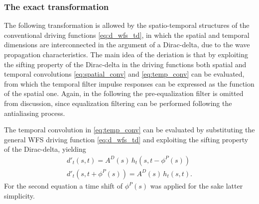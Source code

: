 \documentclass[conference]{IEEEtran}
\begin{document}
\subsubsection{The exact transformation}
The following transformation is allowed by the spatio-temporal structures of the conventional driving functions \eqref{eq:d_wfs_td}, in which the spatial and temporal dimensions are interconnected in the argument of a Dirac-delta, due to the wave propagation characteristics.
The main idea of the deriation is that by exploiting the sifting property of the Dirac-delta in the driving functions both spatial and temporal convolutions \eqref{eq:spatial_conv} and \eqref{eq:temp_conv} can be evaluated, from which the temporal filter impulse responses can be expressed as the function of the spatial one. 
Again, in the following the pre-equalization filter is omitted from discussion, since equalization filtering can be performed following the antialiasing process. 

The temporal convolution in \eqref{eq:temp_conv} can be evaluated by substituting the general WFS driving function \eqref{eq:d_wfs_td} and exploiting the sifting property of the Dirac-delta, yielding
\begin{align}
    d'_t(s,t) = A^D(s) \, h_t \!\left(s,t- \phi^P(s) \right) \\
    d'_t(s,t + \phi^P(s) ) = A^D(s) \, h_t \!\left(s,t\right).
    \label{eq:temp_conv_eval}
\end{align}
For the second equation a time shift of $\phi^P(s)$ was applied for the sake latter simplicity.
\end{document}
